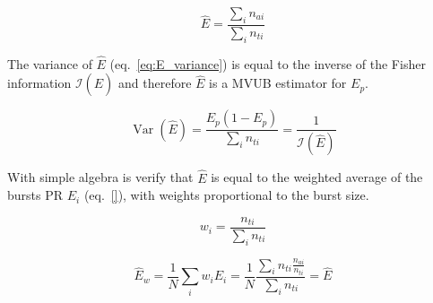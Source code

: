 \begin{equation}
\label{eq:E_estim}
\hat{E} = \frac{\sum_i n_{ai}}{\sum_i n_{ti}}
\end{equation}

The variance of $\hat{E}$ (eq.~\ref{eq:E_variance}) is equal to the inverse of 
the Fisher information $\mathcal{I}(\hat{E})$ and therefore $\hat{E}$ is a MVUB 
estimator for $E_p$.

\begin{equation}
\label{eq:E_variance}
\operatorname{Var}(\hat{E}) = \frac{E_p (1 - E_p)}{\sum_i n_{ti}} = \frac{1}{\mathcal{I}(\hat{E})}
\end{equation}

With simple algebra is verify that $\hat{E}$ is equal to the weighted average of the bursts
PR $E_i$ (eq.~\ref{}), with weights proportional to the burst size.

\begin{equation}
\label{eq:weights}
w_i
= \frac{n_{ti}}{\sum_i n_{ti}}
\end{equation}

\begin{equation}
\label{eq:E_wmean}
\hat{E}_w = \frac{1}{N} \sum_i w_i E_i 
= \frac{1}{N} \frac{\sum_i n_{ti} \frac{n_{ai}}{n_{ti}} }{\sum_i n_{ti}} = \hat{E}
\end{equation}



